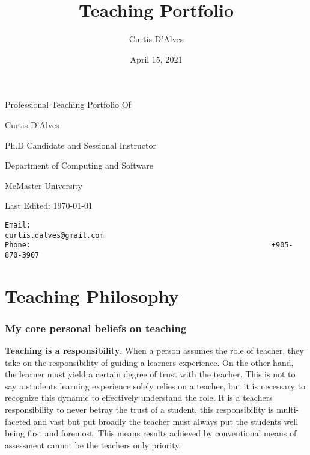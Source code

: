 \documentclass[12pt]{report}
\author{Curtis D'Alves}
\date{April 15, 2021}
\title{Teaching Portfolio}
\def\mytitle{??? Program Code ???}
\begin{document}
\def\labelitemi{$\diamond$}
\def\labelitemii{$\circ$}
\def\labelitemiii{$\star$}

%

\begin{center}


\thispagestyle{empty}

{\color{white}{.}}

\vspace{5em}

{\Huge Professional Teaching Portfolio Of}

\vspace{1em}

{\Large \href{mailto:curtis.dalves@gmail.com}{Curtis D'Alves}}

\vspace{2em}
Ph.D Candidate and Sessional Instructor

Department of Computing and Software

McMaster University

\vspace{2em}
Last Edited: \today

\vfill

\def\mytitle{{\sc Contact \hspace{12em} \color{grey}{.} }}
\begin{verbatim}
Email:                                                        curtis.dalves@gmail.com
Phone:                                                        +905-870-3907
\end{verbatim}
\end{center}

\thispagestyle{empty}
\tableofcontents
\newpage

\part{Teaching Philosophy}
\label{sec:org4f67baf}
\section{My core personal beliefs on teaching}
\label{sec:orgc449993}

\textbf{Teaching is a responsibility}. When a person assumes the role of teacher,
they take on the responsibility of guiding a learners experience. On the other
hand, the learner must yield a certain degree of trust with the teacher. This
is not to say a students learning experience solely relies on a teacher, but
it is necessary to recognize this dynamic to effectively understand the role.
It is a teachers responsibility to never betray the trust of a student, this
responsibility is multi-faceted and vast but put broadly the teacher must
always put the students well being first and foremost. This means results
achieved by conventional means of assessment cannot be the teachers only
priority.
\end{document}
